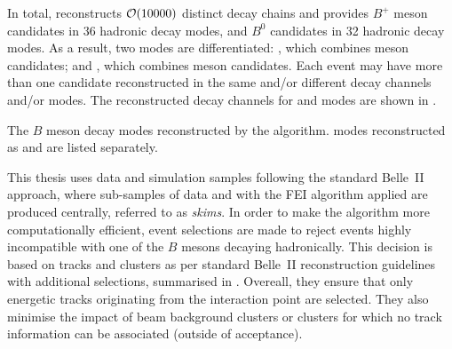 In total, \FEI reconstructs ${\cal O}(10000)$ distinct decay chains and provides $B^+$ meson candidates in 36 hadronic decay modes, and $B^0$ candidates in 32 hadronic decay modes.
As a result, two \FEI modes are differentiated: 
\feiBp, which combines \Bpm meson candidates;
and \feiBz, which combines \Bz meson candidates.
Each event may have more than one candidate reconstructed in the same and/or different decay channels and/or \FEI modes.
The reconstructed decay channels for \feiBp and \feiBz modes are shown in .

\begin{table}
    \centering
    \caption{\label{tab:fei_modes}
    The $B$ meson decay modes reconstructed by the \FEI algorithm.
    \FEI modes reconstructed as \feiBp and \feiBz are listed separately.
    }
    
\end{table}


This thesis uses data and simulation samples following the standard Belle~II approach, where sub-samples of data and \MC with the FEI algorithm applied are produced centrally, referred to as \textit{\FEI skims}.
In order to make the \FEI algorithm more computationally efficient, event selections are made to reject events highly incompatible with one of the $B$ mesons decaying hadronically.
This decision is based on tracks and clusters as per standard Belle~II reconstruction guidelines with additional selections, summarised in .
Overeall, they ensure that only energetic tracks originating from the interaction point are selected.
They also minimise the impact of beam background clusters or clusters for which no track information can be associated (outside of \CDC acceptance).

